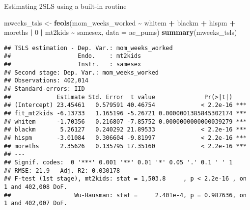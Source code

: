 \documentclass[
  ignorenonframetext,
]{beamer}
\newenvironment{Shaded}{\begin{snugshade}}{\end{snugshade}}
\newcommand{\AttributeTok}[1]{\textcolor[rgb]{0.13,0.29,0.53}{#1}}
\newcommand{\DecValTok}[1]{\textcolor[rgb]{0.00,0.00,0.81}{#1}}
\newcommand{\FunctionTok}[1]{\textcolor[rgb]{0.13,0.29,0.53}{\textbf{#1}}}
\newcommand{\NormalTok}[1]{#1}
\newcommand{\OtherTok}[1]{\textcolor[rgb]{0.56,0.35,0.01}{#1}}
\newcommand{\SpecialCharTok}[1]{\textcolor[rgb]{0.81,0.36,0.00}{\textbf{#1}}}
\begin{document}
\begin{frame}[fragile]{Estimating 2SLS using a built-in routine}
\label{estimating-2sls-using-a-built-in-routine-2}
\tiny

\begin{Shaded}
\begin{Highlighting}[]
\NormalTok{mweeks\_tsls }\OtherTok{\textless{}{-}} \FunctionTok{feols}\NormalTok{(mom\_weeks\_worked }\SpecialCharTok{\textasciitilde{}}\NormalTok{ whitem }\SpecialCharTok{+}\NormalTok{ blackm }\SpecialCharTok{+}\NormalTok{ hispm }\SpecialCharTok{+}\NormalTok{ moreths }\SpecialCharTok{|} 
                \DecValTok{0} \SpecialCharTok{|} 
\NormalTok{                mt2kids }\SpecialCharTok{\textasciitilde{}}\NormalTok{ samesex,}
              \AttributeTok{data =}\NormalTok{ ae\_pums)}
\FunctionTok{summary}\NormalTok{(mweeks\_tsls)}
\end{Highlighting}
\end{Shaded}

\begin{verbatim}
## TSLS estimation - Dep. Var.: mom_weeks_worked
##                   Endo.    : mt2kids
##                   Instr.   : samesex
## Second stage: Dep. Var.: mom_weeks_worked
## Observations: 402,014
## Standard-errors: IID 
##             Estimate Std. Error  t value              Pr(>|t|)    
## (Intercept) 23.45461   0.579591 40.46754             < 2.2e-16 ***
## fit_mt2kids -6.13733   1.165196 -5.26721 0.0000001385845302174 ***
## whitem      -1.70356   0.216807 -7.85752 0.0000000000000039279 ***
## blackm       5.26127   0.240292 21.89533             < 2.2e-16 ***
## hispm       -3.01084   0.306604 -9.81997             < 2.2e-16 ***
## moreths      2.35626   0.135795 17.35160             < 2.2e-16 ***
## ---
## Signif. codes:  0 '***' 0.001 '**' 0.01 '*' 0.05 '.' 0.1 ' ' 1
## RMSE: 21.9   Adj. R2: 0.030178
## F-test (1st stage), mt2kids: stat = 1,503.8     , p < 2.2e-16 , on 1 and 402,008 DoF.
##                  Wu-Hausman: stat =     2.401e-4, p = 0.987636, on 1 and 402,007 DoF.
\end{verbatim}
\end{frame}
\end{document}
